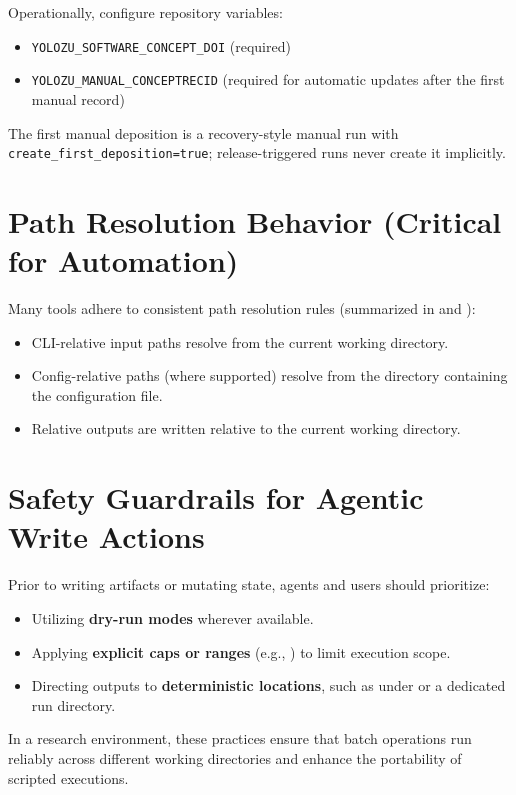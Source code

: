 Operationally, configure repository variables:
\begin{itemize}
  \item \texttt{YOLOZU\_SOFTWARE\_CONCEPT\_DOI} (required)
  \item \texttt{YOLOZU\_MANUAL\_CONCEPTRECID} (required for automatic updates after the first manual record)
\end{itemize}
The first manual deposition is a recovery-style manual run with
\texttt{create\_first\_deposition=true}; release-triggered runs never create it
implicitly.

\section{Path Resolution Behavior (Critical for Automation)}
Many tools adhere to consistent path resolution rules (summarized in  and ):
\begin{itemize}
  \item CLI-relative input paths resolve from the current working directory.
  \item Config-relative paths (where supported) resolve from the directory containing the configuration file.
  \item Relative outputs are written relative to the current working directory.
\end{itemize}

\section{Safety Guardrails for Agentic Write Actions}
Prior to writing artifacts or mutating state, agents and users should prioritize:
\begin{itemize}
  \item Utilizing \textbf{dry-run modes} wherever available.
  \item Applying \textbf{explicit caps or ranges} (e.g., ) to limit execution scope.
  \item Directing outputs to \textbf{deterministic locations}, such as under  or a dedicated run directory.
\end{itemize}

In a research environment, these practices ensure that batch operations run reliably across different working directories and enhance the portability of scripted executions.
